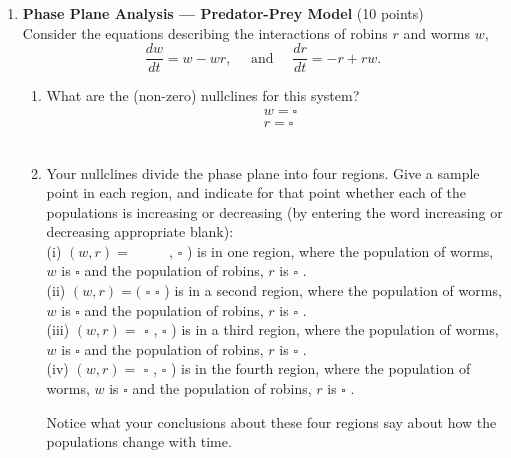\begin{enumerate}
  \item \textbf{Phase Plane Analysis --- Predator-Prey Model} (10 points)\\
  Consider the equations describing the interactions of robins $r$ and worms $w$,
  $$
  \frac{d w}{d t}=w-w r, \quad \text { and } \quad \frac{d r}{d t}=-r+r w .
  $$
  \begin{enumerate}[label=\alph*]
    \item What are the (non-zero) nullclines for this system?\\
    $$
    \begin{aligned}
    & w=\square \\
    & r=\square
    \end{aligned}
    $$\\
    \begin{subanswer}
    \end{subanswer}
    \item Your nullclines divide the phase plane into four regions. Give a sample point in each region, and indicate for that point whether each of the populations is increasing or decreasing (by entering the word increasing or decreasing appropriate blank):\\
    (i) $(w, r)=$ $\qquad$ , $\square$ ) is in one region, where the population of worms, $w$ is $\square$ and the population of robins, $r$ is $\square$ .\\
    (ii) $(w, r)=($ $\square$ $\square$ ) is in a second region, where the population of worms, $w$ is $\square$ and the population of robins, $r$ is $\square$ .\\
    (iii) $(w, r)=$ $\square$ , $\square$ ) is in a third region, where the population of worms, $w$ is $\square$ and the population of robins, $r$ is $\square$ .\\
    (iv) $(w, r)=$ $\square$ , $\square$ ) is in the fourth region, where the population of worms, $w$ is $\square$ and the population of robins, $r$ is $\square$ .\\
    \begin{subanswer}
    \end{subanswer}
    Notice what your conclusions about these four regions say about how the populations change with time.
  \end{enumerate}


\end{enumerate}
